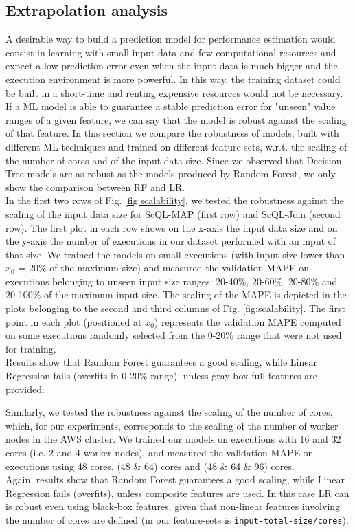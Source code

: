 \documentclass[a4paper, 10pt, conference]{ieeeconf}      %
\begin{document}
\subsection{Extrapolation analysis}
\label{subsec:extrapolation}
A desirable way to build a prediction model for performance estimation would consist in learning with small input data and few computational resources and expect a low prediction error even when the input data is much bigger and the execution environment is more powerful. In this way, the training dataset could be built in a short-time and renting expensive resources would not be necessary.
If a ML model is able to guarantee a stable prediction error for "unseen" value ranges of a given feature, we can say that the model is robust against the scaling of that feature.
In this section we compare the robustness of models, built with different  ML techniques and trained on different feature-sets, w.r.t. the scaling of the number of cores and of the input data size. Since we observed that Decision Tree models are as robust as the models produced by Random Forest, we only show the comparison between RF and LR.\\
In the first two rows of Fig. \ref{fig:scalability}, we tested the robustness against the scaling of the input data size for ScQL-MAP (first row) and ScQL-Join (second row). The first plot in each row shows on the x-axis the input data size and on the y-axis the number of executions in our dataset performed with an input of that size.
We trained the models on small executions (with input size lower than $x_0$ = 20\% of the maximum size) and measured the validation MAPE on executions belonging to unseen input size ranges: 20-40\%, 20-60\%, 20-80\% and 20-100\% of the maximum input size.
The scaling of the MAPE is depicted in the plots belonging to the second and third columns of Fig. \ref{fig:scalability}. The first point in each plot (positioned at $x_0$) represents the validation MAPE computed on some executions randomly selected  from the 0-20\% range that were not used for training. \\
Results show that Random Forest guarantees a good scaling, while Linear Regression fails (overfits in 0-20\% range), unless gray-box full features are provided. 

Similarly, we tested the robustness against the scaling of the number of cores, which, for our experiments, corresponds to the scaling of the number of worker nodes in the AWS cluster. We trained our models on executions with 16 and 32 cores (i.e. 2 and 4 worker nodes), and measured the validation MAPE on executions using 48 cores, (48 \& 64) cores and (48 \& 64 \& 96) cores.\\
Again, results show that Random Forest guarantees a good scaling, while Linear Regression fails (overfits), unless composite features are used. In this case LR can is robust even using black-box features, given that non-linear features involving the number of cores are defined (in our feature-sets is \texttt{input-total-size/cores}).
\end{document}
